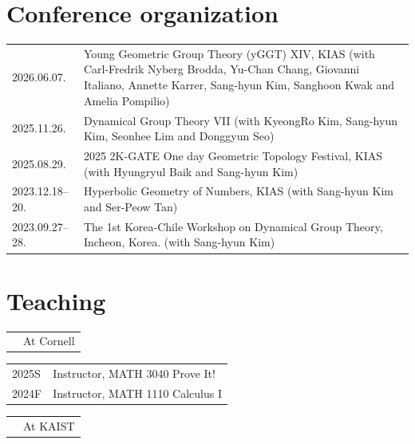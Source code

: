 \documentclass[a4paper, 10pt]{article}
\begin{document}
\section{Conference organization} 


\begin{tabular}{Q{2.45cm}P{13cm}}
\small{2026.06.07.} & Young Geometric Group Theory (yGGT) XIV, KIAS (with Carl-Fredrik Nyberg Brodda, Yu-Chan Chang, Giovanni Italiano, Annette Karrer, Sang-hyun Kim, Sanghoon Kwak and Amelia Pompilio) \\
\small{2025.11.26.} & Dynamical Group Theory VII
(with KyeongRo Kim, Sang-hyun Kim, Seonhee Lim and Donggyun Seo)\\
\small{2025.08.29.} & 2025 2K-GATE One day Geometric Topology Festival, KIAS
(with Hyungryul Baik and Sang-hyun Kim)\\
\small{2023.12.18--20.} & Hyperbolic Geometry of Numbers, KIAS (with Sang-hyun Kim and Ser-Peow Tan)\\
\small{2023.09.27--28.} & The 1st Korea-Chile Workshop on Dynamical Group Theory, Incheon, Korea. (with Sang-hyun Kim)
\end{tabular}

\section{Teaching}

\vspace{8pt}
\begin{tabular}{Q{2.5cm}P{13cm}}
&{\large At Cornell}
\end{tabular}
\vspace{6pt}

\begin{tabular}{Q{2.5cm}P{13cm}}
\small{2025S} & Instructor, MATH 3040 Prove It! \\
\small{2024F} & Instructor, MATH 1110 Calculus I \\
\end{tabular}

\vspace{8pt}
\begin{tabular}{Q{2.5cm}P{13cm}}
&{\large At KAIST}
\end{tabular}
\vspace{6pt}
\end{document}
